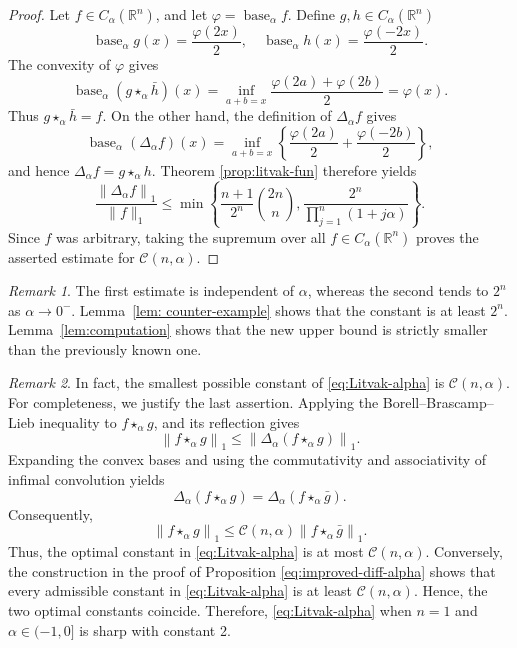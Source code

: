 \documentclass[11pt]{amsart}
\newcommand{\R}{{\mathbb R}}
\theoremstyle{plain}
\theoremstyle{definition}
\theoremstyle{remark}
\newtheorem{remark}{Remark}
\begin{document}
\begin{proof}
    Let $f \in C_\alpha (\R^n)$, and let $\varphi=\operatorname{base}_\alpha f$. Define $g, h \in C_\alpha\left(\mathbb{R}^n\right)$
$$
\operatorname{base}_\alpha g(x)=\frac{\varphi(2 x)}{2}, \quad \operatorname{base}_\alpha h(x)=\frac{\varphi(-2 x)}{2} .
$$
The convexity of $\varphi$ gives
$$
\operatorname{base}_\alpha\left(g \star_\alpha \bar{h}\right)(x)=\inf _{a+b=x} \frac{\varphi(2 a)+\varphi(2 b)}{2}=\varphi(x) .
$$
Thus $g \star_\alpha \bar{h}=f$. On the other hand, the definition of $\Delta_\alpha f$ gives
$$
\operatorname{base}_\alpha\left(\Delta_\alpha f\right)(x)=\inf _{a+b=x}\left\{\frac{\varphi(2 a)}{2}+\frac{\varphi(-2 b)}{2}\right\},
$$
and hence $\Delta_\alpha f=g \star_\alpha h$. Theorem \ref{prop:litvak-fun} therefore yields
$$
\frac{\left\|\Delta_\alpha f\right\|_1}{\|f\|_1 } \leq \min \left\{\frac{n+1}{2^n}\binom{2 n}{n}, \frac{2^n}{\prod_{j=1}^n(1+j \alpha)} \right\}.
$$
Since $f$ was arbitrary, taking the supremum over all $f \in C_\alpha (\R^n)$ proves the asserted estimate for $\mathcal{C}(n, \alpha)$.
\end{proof}
\begin{remark}
    The first estimate is independent of $\alpha$, whereas the second tends to $2^n$ as $\alpha \rightarrow 0^{-}$. Lemma~\ref{lem: counter-example} shows that the constant is at least $2^n$. Lemma~\ref{lem:computation} shows that the new upper bound is strictly smaller than the previously known one.
\end{remark}
\begin{remark}
In fact, the smallest possible constant of \eqref{eq:Litvak-alpha} is $\mathcal{C}(n,\alpha)$. For completeness, we justify the last assertion.
    Applying the Borell--Brascamp--Lieb inequality to $f \star_\alpha g$, and its reflection gives
    $$
    \left\|f \star_\alpha g\right\|_1 \leq\left\|\Delta_\alpha\left(f \star_\alpha g\right)\right\|_1 .
    $$
    Expanding the convex bases and using the commutativity and associativity of infimal convolution yields
    $$
    \Delta_\alpha\left(f \star_\alpha g\right)=\Delta_\alpha\left(f \star_\alpha \bar{g}\right) .
    $$
    Consequently,
    $$
    \left\|f \star_\alpha g\right\|_1 \leq \mathcal{C}(n, \alpha)\left\|f \star_\alpha \bar{g}\right\|_1 .
    $$
Thus, the optimal constant in \eqref{eq:Litvak-alpha} is at most $\mathcal{C}(n, \alpha)$. Conversely, the construction in the proof of Proposition \ref{eq:improved-diff-alpha} shows that every admissible constant in \eqref{eq:Litvak-alpha} is at least $\mathcal{C}(n, \alpha)$. Hence, the two optimal constants coincide. Therefore, \eqref{eq:Litvak-alpha} when $n=1$ and $ \alpha \in (-1,0]$ is sharp with constant 2.
\end{remark}
\end{document}
